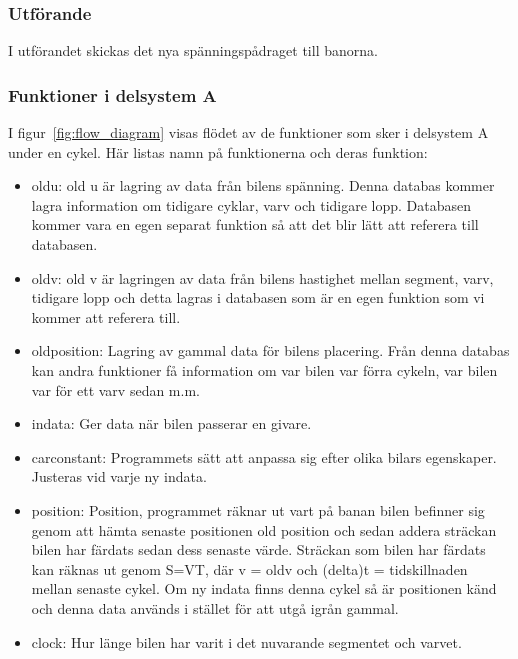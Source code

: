    \subsubsection{Utförande}

    I utförandet skickas det nya spänningspådraget till banorna. 
	

    \subsubsection{Funktioner i delsystem A} \label{sec:system_a_funcs}
    I figur~\ref{fig:flow_diagram}  visas flödet av de funktioner som sker i delsystem A under en cykel.
    Här listas namn på funktionerna och deras funktion:
    \begin{itemize}
	\item old\textunderscore u: old u är lagring av data från bilens spänning. Denna databas kommer lagra information om tidigare cyklar, varv och tidigare lopp. Databasen kommer vara en egen separat funktion så att det blir lätt att referera till databasen.
	\item old\textunderscore v: old v är lagringen av data från bilens hastighet mellan segment, varv, tidigare lopp och detta lagras i databasen som är en egen funktion som vi kommer att referera till. 
	\item old\textunderscore position: Lagring av gammal data för bilens placering. Från denna databas kan andra funktioner få information om var bilen var förra cykeln, var bilen var för ett varv sedan m.m.
      \item indata: Ger data när bilen passerar en givare.
      \item car\textunderscore constant: Programmets sätt att anpassa sig efter olika bilars egenskaper. Justeras vid varje ny indata.
      \item position: Position, programmet räknar ut vart på banan bilen befinner sig genom att hämta senaste positionen old position och sedan addera sträckan bilen har färdats sedan dess senaste värde. Sträckan som bilen har färdats kan räknas ut genom S=V\textasteriskcentered T, där v = old\textunderscore v och (delta)t = tidskillnaden mellan senaste cykel. Om ny indata finns denna cykel så är positionen känd och denna data används i stället för att utgå igrån gammal.
      \item clock: Hur länge bilen har varit i det nuvarande segmentet och varvet.


\end{itemize}
